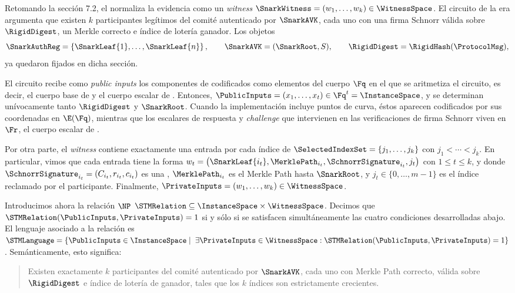 
Retomando la sección 7.2, el \MithrilAggregator normaliza la evidencia como un \textit{witness} $\SnarkWitness = (w_1, \ldots, w_k) \in \WitnessSpace$. El circuito \HaloTwo de la era \Lagrange argumenta que existen $k$ participantes legítimos del comité autenticado por $\SnarkAVK$, cada uno con una firma Schnorr válida sobre $\RigidDigest$, un Merkle correcto e índice de lotería ganador. Los objetos
$$\SnarkAuthReg = \left\{\SnarkLeaf{1},\ldots,\SnarkLeaf{n}\right\}, \qquad \SnarkAVK = (\SnarkRoot, S), \qquad \RigidDigest = \RigidHash(\ProtocolMsg),$$
ya quedaron fijados en dicha sección.

El circuito recibe como \textit{public inputs} los componentes de \ProtocolMsg codificados como elementos del cuerpo $\Fq$ en el que se aritmetiza el circuito, es decir, el cuerpo base de \Jubjub y el cuerpo escalar de \BLS. Entonces, $\PublicInputs = (x_1,\ldots,x_t) \in \Fq^t = \InstanceSpace$, y se determinan unívocamente tanto $\RigidDigest$ y $\SnarkRoot$. Cuando la implementación incluye puntos de curva, éstos aparecen codificados por sus coordenadas en $\E(\Fq)$, mientras que los escalares de respuesta y \textit{challenge} que intervienen en las verificaciones de firma Schnorr viven en $\Fr$, el cuerpo escalar de \Jubjub.

Por otra parte, el \textit{witness} contiene exactamente una entrada por cada índice de $\SelectedIndexSet = \{j_1, \ldots, j_k\}$ con $j_1 < \cdots < j_k$. En particular, vimos que cada entrada tiene la forma $w_t = \left(\SnarkLeaf{i_t}, \MerklePath_{i_t}, \SchnorrSignature_{i_t}, j_t\right)$ con $1 \leq t \leq k$, y donde $\SchnorrSignature_{i_t} = (C_{i_t},r_{i_t},c_{i_t})$ es una \UniqueSchnorrSignature, $\MerklePath_{i_t}$ es el Merkle Path hasta $\SnarkRoot$, y $j_t \in \{0, \ldots, m - 1\}$ es el índice reclamado por el participante. Finalmente, $\PrivateInputs = (w_1, \ldots, w_k) \in \WitnessSpace$.

Introducimos ahora la relación $\NP$ $\STMRelation \subseteq \InstanceSpace \times \WitnessSpace$. Decimos que $\STMRelation(\PublicInputs, \PrivateInputs) = 1$ si y sólo si se satisfacen simultáneamente las cuatro condiciones desarrolladas abajo. El lenguaje asociado a la relación es $\STMLanguage = \left\{\PublicInputs \in \InstanceSpace \mid \; \exists \PrivateInputs \in \WitnessSpace:  \STMRelation(\PublicInputs, \PrivateInputs) = 1 \right\}$. Semánticamente, esto significa:

\begin{quote}
	Existen exactamente $k$ participantes del comité autenticado por $\SnarkAVK$, cada uno con Merkle Path correcto, \UniqueSchnorrSignature válida sobre $\RigidDigest$ e índice de lotería de \Mithril ganador, tales que los $k$ índices son estrictamente crecientes.
\end{quote}

